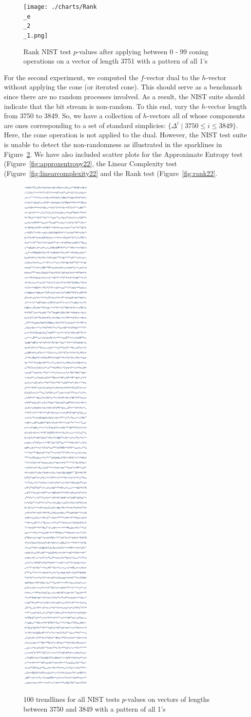 \documentclass[oneside,12pt]{amsart}
\theoremstyle{definition}
\numberwithin{equation}{section}
\begin{document}
\begin{figure}[h!]
\centering
\caption{Rank NIST test $p$-values after applying between 0 - 99 coning operations on a vector of length 3751 with a pattern of all 1's}
\texttt{[image: ./charts/Rank\\\_e\\\_2\\\_1.png]}
\label{fig:rank21}
\end{figure}

\clearpage
\indent For the second experiment, we computed the $f$-vector dual to the $h$-vector without applying the cone (or iterated cone). This should serve as a benchmark since there are no random processes involved.  As a result, the NIST suite should indicate that the bit stream is non-random.  To this end, vary the $h$-vector length from 3750 to 3849. So, we have a collection of $h$-vectors all of whose components are ones corresponding to a set of standard simplicies:  $\{\Delta^i \;| \; 3750 \leq i \leq 3849\}$.  Here, the cone operation is not applied to the dual. However, the NIST test suite is unable to detect the non-randomness as illustrated in the sparklines in Figure~\ref{fig:lengths}.  We have also included scatter plots for the Approximate Entropy test (Figure~\ref{fig:approxentropy22}, the Linear Complexity test (Figure~\ref{fig:linearcomplexity22} and the Rank test (Figure~\ref{fig:rank22}.  %



\begin{figure}[h!]
\centering
\caption{100 trendlines for all NIST tests $p$-values on vectors of lengths between 3750 and 3849 with a pattern of all 1's}
\includegraphics[width=0.8\linewidth, height=0.5\linewidth]{./charts/varying-lengths-v2-alt.png}
\label{fig:lengths}
\end{figure}
\end{document}
